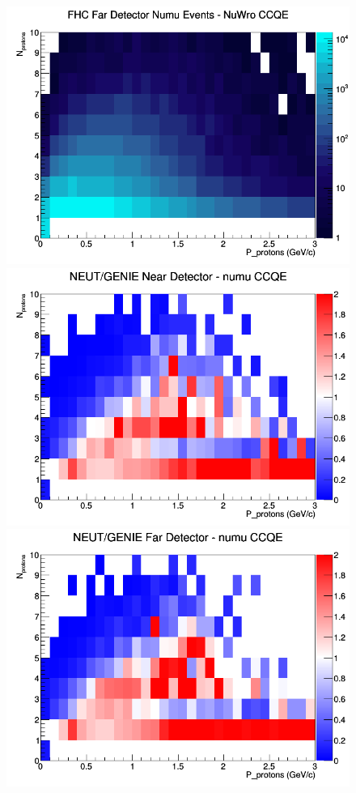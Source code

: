 \documentclass[12pt]{article}
\begin{document}
\begin{figure}[h]
\endminipage
{}
\includegraphics[width=\linewidth]{N_P/nominal/protons/CCQE_FHC_FD_numu_N_P_NuWro.png}
\endminipage
\newline
{}
\includegraphics[width=\linewidth]{N_P/nominal/protons/ratios/CCQE_NEUT_GENIE_numu_near_N_P.png}
\endminipage
{}
\includegraphics[width=\linewidth]{N_P/nominal/protons/ratios/CCQE_NEUT_GENIE_numu_far_N_P.png}

\end{figure}
\end{document}
